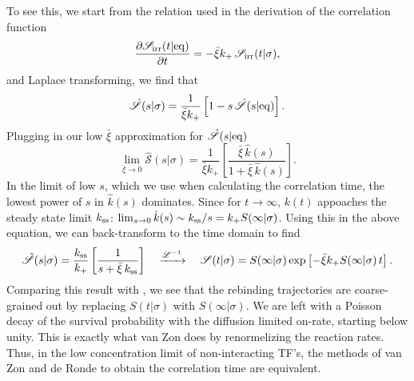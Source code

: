 To see this, we start from the relation used in the derivation of the correlation function 
\begin{equation}
 \frac{\partial \mathscr{S}_{\rm irr}(t|{\rm eq})}{\partial t} = -\bar{\xi} k_+ \, \mathscr{S}_{\rm irr}(t|\sigma),
\end{equation}
and Laplace transforming, we find that
\begin{equation}
 \hat{\mathscr{S}}(s|\sigma) = \frac{1}{\bar{\xi}k_+} \left[ 1 - s\,\hat{\mathscr{S}}(s|{\rm eq})\right].
\end{equation}
Plugging in our low $\bar{\xi}$ approximation  for $\hat{\mathscr{S}}(s|{\rm eq})$
\begin{equation}
 \lim_{\bar{\xi}\to 0} \hat{\mathscr{S}}(s|\sigma) = \frac{1}{\bar{\xi} k_+} \left[ \frac{\bar{\xi}\,\hat{k}(s)}{1 + \bar{\xi}\,\hat{k}(s)}\right].
\end{equation}
In the limit of low $s$, which we use when calculating the correlation time, the lowest power of $s$ in $\hat{k}(s)$ dominates. Since for $t\to\infty$, $k(t)$ appoaches the steady state limit $k_{\rm ss}$: $\lim_{s\to0} \hat{k}(s) \sim k_{\rm ss}/s = k_+ S(\infty|\sigma)$. Using this in the above equation, we can back-transform to the time domain to find
\begin{equation}
 \hat{\mathscr{S}}(s|\sigma) = \frac{k_{\rm ss}}{k_+} \left[ \frac{1}{s + \bar{\xi}\,k_{\rm ss}} \right] \quad \xrightarrow{\mathscr{L}^{-1}} \quad \mathscr{S}(t|\sigma) = S(\infty|\sigma)\,{\rm exp}\left[ -\bar{\xi} k_+ S(\infty|\sigma)\,t \right].
\end{equation}
Comparing this result with , we see that the rebinding trajectories are coarse-grained out by replacing $S(t|\sigma)$ with $S(\infty|\sigma)$. We are left with a Poisson decay of the survival probability with the diffusion limited on-rate, starting below unity. This is exactly what van Zon does by renormelizing the reaction rates. Thus, in the low concentration limit of non-interacting TF's, the methods of van Zon and de Ronde to obtain the correlation time are equivalent.


